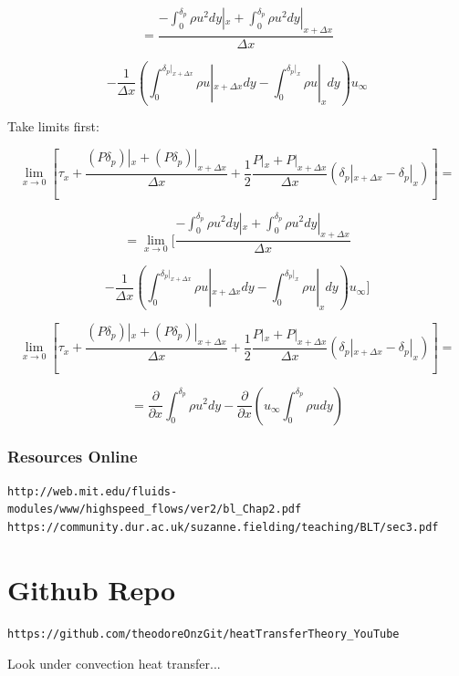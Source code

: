 \documentclass[11pt]{article}
\begin{document}
$$=  \frac{- \int_0^{\delta_p} \rho u^2 dy |_x +   \int_0^{\delta_p} \rho u^2 dy |_{x+\Delta x}}{\Delta x}  $$

$$ - \frac{1}{\Delta x} (  \int_0^{\delta_p |_{x+\Delta x}} \rho u |_{x+ \Delta x}dy -  \int_0^{\delta_p |_{x}} \rho u |_{x}dy) u_\infty  $$

Take limits first:

$$ \lim_{x \rightarrow 0} [\tau_x   + \frac{(P \delta_p )|_x +  (P \delta_p )|_{x+\Delta x}}{\Delta x}  + \frac{1}{2} \frac{P|_x + P|_{x+\Delta x}}{\Delta x} (\delta_p|_{x+\Delta x} - \delta_p|_{x})] = $$

$$=  \lim_{x \rightarrow 0}[ \frac{- \int_0^{\delta_p} \rho u^2 dy |_x +   \int_0^{\delta_p} \rho u^2 dy |_{x+\Delta x}}{\Delta x}  $$

$$ - \frac{1}{\Delta x} (  \int_0^{\delta_p |_{x+\Delta x}} \rho u |_{x+ \Delta x}dy -  \int_0^{\delta_p |_{x}} \rho u |_{x}dy) u_\infty]   $$

$$ \lim_{x \rightarrow 0} [\tau_x   + \frac{(P \delta_p )|_x +  (P \delta_p )|_{x+\Delta x}}{\Delta x}  + \frac{1}{2} \frac{P|_x + P|_{x+\Delta x}}{\Delta x} (\delta_p|_{x+\Delta x} - \delta_p|_{x})] = $$

$$=  \frac{\partial }{\partial x} \int_0^{\delta_p} \rho u^2 dy    - \frac{\partial }{\partial x} (u_\infty \int_0^{\delta_p } \rho u dy )   $$

\section{Resources Online}


\begin{verbatim}
http://web.mit.edu/fluids-modules/www/highspeed_flows/ver2/bl_Chap2.pdf
https://community.dur.ac.uk/suzanne.fielding/teaching/BLT/sec3.pdf
\end{verbatim}

\part{Github Repo}
\begin{verbatim}
https://github.com/theodoreOnzGit/heatTransferTheory_YouTube
\end{verbatim}

Look under convection heat transfer...
\end{document}
